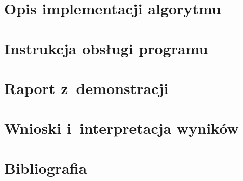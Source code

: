 \documentclass[12pt]{article}
\begin{document}
\section{Opis implementacji algorytmu}
\section{Instrukcja obsługi programu}
\section{Raport z~demonstracji}
\section{Wnioski i~interpretacja wyników}
\section*{Bibliografia}
\end{document}
